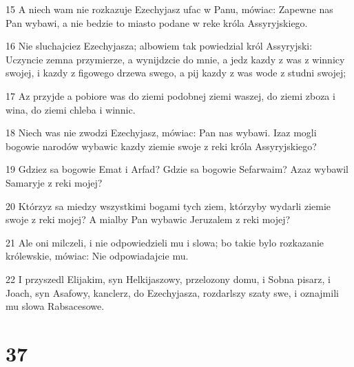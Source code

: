 \par 15 A niech wam nie rozkazuje Ezechyjasz ufac w Panu, mówiac: Zapewne nas Pan wybawi, a nie bedzie to miasto podane w reke króla Assyryjskiego.
\par 16 Nie sluchajciez Ezechyjasza; albowiem tak powiedzial król Assyryjski: Uczyncie zemna przymierze, a wynijdzcie do mnie, a jedz kazdy z was z winnicy swojej, i kazdy z figowego drzewa swego, a pij kazdy z was wode z studni swojej;
\par 17 Az przyjde a pobiore was do ziemi podobnej ziemi waszej, do ziemi zboza i wina, do ziemi chleba i winnic.
\par 18 Niech was nie zwodzi Ezechyjasz, mówiac: Pan nas wybawi. Izaz mogli bogowie narodów wybawic kazdy ziemie swoje z reki króla Assyryjskiego?
\par 19 Gdziez sa bogowie Emat i Arfad? Gdzie sa bogowie Sefarwaim? Azaz wybawil Samaryje z reki mojej?
\par 20 Którzyz sa miedzy wszystkimi bogami tych ziem, którzyby wydarli ziemie swoje z reki mojej? A mialby Pan wybawic Jeruzalem z reki mojej?
\par 21 Ale oni milczeli, i nie odpowiedzieli mu i slowa; bo takie bylo rozkazanie królewskie, mówiac: Nie odpowiadajcie mu.
\par 22 I przyszedl Elijakim, syn Helkijaszowy, przelozony domu, i Sobna pisarz, i Joach, syn Asafowy, kanclerz, do Ezechyjasza, rozdarlszy szaty swe, i oznajmili mu slowa Rabsacesowe.

\chapter{37}

